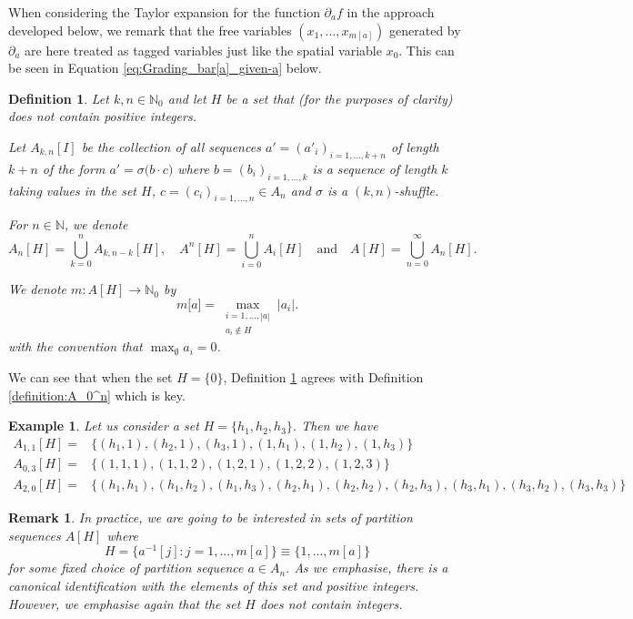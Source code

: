 \documentclass[a4paper,11pt,twoside]{article}
\numberwithin{equation}{section}
\theoremstyle{plain}
\newtheorem{definition}[theorem]{Definition}
\newtheorem{remark}[theorem]{Remark}
\newtheorem{example}[theorem]{Example}
\newcommand{\bN}{\mathbb{N}}
\newcommand{\1}{\mathbbm{1}}
\begin{document}
	When considering the Taylor expansion for the function $\partial_a f$ in the approach developed below, we remark that the free variables $(x_1, ..., x_{m[a]})$ generated by $\partial_a$ are here treated as tagged variables just like the spatial variable $x_0$. This can be seen in Equation \eqref{eq:Grading_bar[a]_given-a} below. 
	
	\begin{definition}
		\label{definition:A_0^n-H}
		Let $k, n\in \bN_0$ and let $H$ be a set that (for the purposes of clarity) does not contain positive integers. 
		
		Let $A_{k, n}[I]$ be the collection of all sequences $a'=(a'_i)_{i=1, ..., k+n}$ of length $k+n$ of the form $a' = \sigma\big( b\cdot c\big)$ where $b = (b_i)_{i=1, ..., k}$ is a sequence of length $k$ taking values in the set $H$, $c = (c_i)_{i=1, ..., n} \in A_n$ and $\sigma$ is a $(k, n)$-shuffle. 
		
		For $n\in \bN$, we denote
		$$
		A_{n}[H] = \bigcup_{k=0}^n A_{k, n-k}[H], 
		\quad
		A^n[H] = \bigcup_{i=0}^n A_{i}[H] 
		\quad \mbox{and} \quad
		A[H] = \bigcup_{n=0}^\infty A_{n}[H]. 
		$$
		
		We denote $m:A[H] \to \bN_0$ by
		$$
		m\big[ a \big] = \max_{\substack{i = 1, ..., |a| \\ a_i \notin H}} |a_i|. 
		$$
		with the convention that $\max_{\emptyset} a_i = 0$. 
	\end{definition}
	
	We can see that when the set $H = \{0\}$, Definition \ref{definition:A_0^n-H} agrees with Definition \ref{definition:A_0^n} which is key.
	
	\begin{example}
		Let us consider a set $H = \{ h_1, h_2, h_3\}$. Then we have
		\begin{align*}
			A_{1,1}[H]=&\Big\{ (h_1, 1), (h_2, 1), (h_3, 1), (1, h_1), (1, h_2), (1, h_3) \Big\}
			\\
			A_{0, 3}[H]=&\Big\{ (1,1,1), (1,1,2), (1,2,1), (1,2,2), (1,2,3) \Big\}
			\\
			A_{2, 0}[H]=&\Big\{  (h_1, h_1), (h_1, h_2), (h_1, h_3), (h_2, h_1), (h_2, h_2), (h_2, h_3), (h_3, h_1), (h_3, h_2), (h_3, h_3) \Big\}
		\end{align*}
	\end{example}
	
	\begin{remark}
		In practice, we are going to be interested in sets of partition sequences $A[H]$ where 
		$$
		H = \big\{ a^{-1}[j]: j=1, ..., m[a] \big\} \equiv \big\{ 1, ..., m[a] \big\}
		$$
		for some fixed choice of partition sequence $a\in A_n$. As we emphasise, there is a canonical identification with the elements of this set and positive integers. However, we emphasise again that the set $H$ does not contain integers. 
	\end{remark}
	
\end{document}

